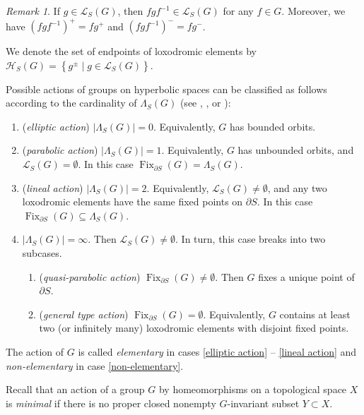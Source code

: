 \documentclass[11pt,letterpaper]{article}
\DeclareMathOperator{\Fix}{Fix}
\theoremstyle{definition}
\theoremstyle{remark}
\newtheorem{rem}[thm]{Remark}
\begin{document}
\begin{rem} \label{congugation}
 If $g \in \mathcal{L}_S(G)$, then $fgf^{-1} \in \mathcal{L}_S(G)$ for any $f\in G$. Moreover, we have $(fgf^{-1})^{+}=fg^+$ and  $(fgf^{-1})^{-}=fg^-$.
\end{rem}

We denote the set of endpoints of loxodromic elements by $ 
\mathcal{H}_S(G)=\left\{ g^\pm \mid g \in \mathcal{L}_S(G) \right\}$.

Possible actions of groups on hyperbolic spaces can be classified as follows according to the cardinality of $\Lambda_S(G)$ (see \cite[Sections 8.1-8.2]{Gro87}, \cite{Ham}, or \cite[Chapter 6]{DSU}):
\begin{enumerate}
\item \label{elliptic action} ({\it elliptic action}) $|\Lambda_S(G)|=0$. Equivalently, $G$ has bounded orbits.
\item \label{parabolic action} ({\it parabolic action}) $|\Lambda_S(G)|=1$. Equivalently, $G$ has unbounded orbits, and $\mathcal{L}_S(G)=\emptyset$. In this case $\Fix_{\partial S}(G)=\Lambda_S(G)$.
\item \label{lineal action} ({\it lineal action}) $|\Lambda_S(G)|=2$. Equivalently, $\mathcal{L}_S(G) \neq \emptyset$, and any two loxodromic elements have the same fixed points on $\partial S$. In this case $\Fix_{\partial S}(G) \subseteq \Lambda_S(G)$.
\item \label{non-elementary} $|\Lambda_S(G)|=\infty$. Then $\mathcal{L}_S(G) \neq \emptyset$. In turn, this case breaks into two subcases.
	\begin{enumerate}
	\item \label{quasi-parabolic action} ({\it quasi-parabolic action}) $\Fix_{\partial S}(G) \neq \emptyset$. Then $G$ fixes a unique point of $\partial S$.
	\item \label{general type action} ({\it general type action}) $\Fix_{\partial S}(G)=\emptyset$. Equivalently, $G$ contains at least two (or infinitely many) loxodromic elements with disjoint fixed points.
	\end{enumerate}
\end{enumerate}

The action of $G$ is called {\it elementary} in cases \ref{elliptic action} -- \ref{lineal action} and {\it non-elementary} in case \ref{non-elementary}.

Recall that an action of a group $G$ by homeomorphisms on a topological space $X$ is {\it minimal} if there is no proper closed nonempty $G$-invariant subset $Y \subset X$.
\end{document}

